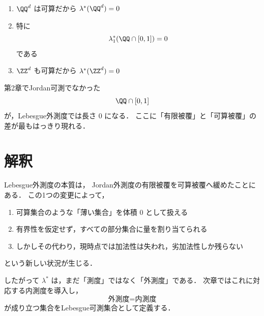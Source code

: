\begin{example}
\begin{enumerate}
    \item $\QQ^d$ は可算だから $\lambda^*(\QQ^d)=0$
    \item 特に
    \[
    \lambda_1^*(\QQ \cap [0,1]) = 0
    \]
    である
    \item $\ZZ^d$ も可算だから $\lambda^*(\ZZ^d)=0$
\end{enumerate}
\end{example}

\begin{remark}
第2章でJordan可測でなかった
\[
\QQ \cap [0,1]
\]
が，Lebesgue外測度では長さ $0$ になる．
ここに「有限被覆」と「可算被覆」の差が最もはっきり現れる．
\end{remark}

\section{解釈}

Lebesgue外測度の本質は，
Jordan外測度の有限被覆を可算被覆へ緩めたことにある．
この1つの変更によって，
\begin{enumerate}
    \item 可算集合のような「薄い集合」を体積 $0$ として扱える
    \item 有界性を仮定せず，すべての部分集合に量を割り当てられる
    \item しかしその代わり，現時点では加法性は失われ，劣加法性しか残らない
\end{enumerate}
という新しい状況が生じる．

したがって $\lambda^*$ は，まだ「測度」ではなく「外測度」である．
次章ではこれに対応する内測度を導入し，
\[
\text{外測度}=\text{内測度}
\]
が成り立つ集合をLebesgue可測集合として定義する．
